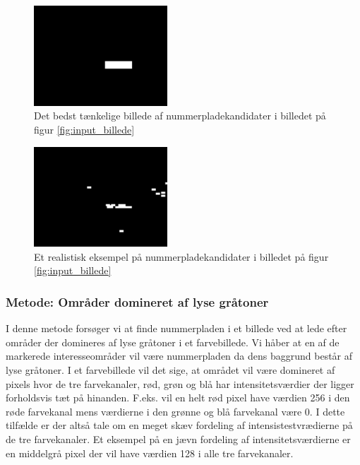 \begin{figure}[htp]
\centering
\includegraphics[width=5cm]{system/illu/binary_ideal.png} 
\caption{Det bedst tænkelige billede af nummerpladekandidater i billedet på figur \ref{fig:input_billede}}
\label{fig:binary_ideal}
\end{figure}

\begin{figure}[htp]
\centering
\includegraphics[width=5cm]{system/illu/binary_real.png} 
\caption{Et realistisk eksempel på nummerpladekandidater i billedet på figur \ref{fig:input_billede}}
\label{fig:binary_real}
\end{figure}

\subsubsection{Metode: Områder domineret af lyse gråtoner}
I denne metode forsøger vi at finde nummerpladen i et billede ved at lede efter områder der domineres af lyse gråtoner i et farvebillede. Vi håber at en af de markerede interesseområder vil være nummerpladen da dens baggrund består af lyse gråtoner. I et farvebillede vil det sige, at området vil være domineret af pixels hvor de tre farvekanaler, rød, grøn og blå har intensitetsværdier der ligger forholdsvis tæt på hinanden. F.eks. vil en helt rød pixel have værdien 256 i den røde farvekanal mens værdierne i den grønne og blå farvekanal være 0. I dette tilfælde er der altså tale om en meget skæv fordeling af intensistestvrædierne på de tre farvekanaler. Et eksempel på en jævn fordeling af intensitetsværdierne er en middelgrå pixel der vil have værdien 128 i alle tre farvekanaler.

